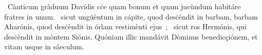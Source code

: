 {~Cànticum gràduum Davídis}
{%
cċe quam bonum et quam jucùndum habitáre fratres in unum.
~sicut ungüèntum in cápite, quod desċèndit in barbam, barbam Aharónis, quod desċèndit in órlam vestimènti ejus~;
~sicut ros Hermónis, qui desċèndit in mòntem Siónis. Quóniam illic mandávit Dòminus benedicçiónem, et vitam usque in sáeculum.}
